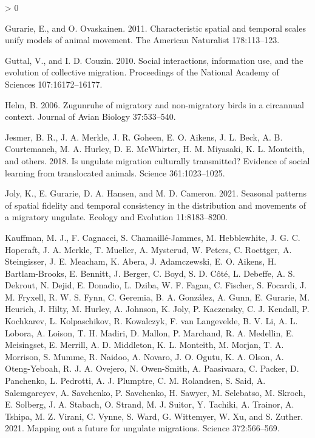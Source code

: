 \documentclass[12pt]{article}
\newlength{\cslhangindent}
\newenvironment{CSLReferences}[2] %
 {%
  \setlength{\parindent}{0pt}
  \ifodd #1 \everypar{\setlength{\hangindent}{\cslhangindent}}\ignorespaces\fi
  \ifnum #2 > 0
  \setlength{\parskip}{#2\baselineskip}
  \fi
 }%
 {}
\begin{document}
\begin{CSLReferences}{1}{0}
\leavevmode\hypertarget{ref-Gurarie2011}{}%
Gurarie, E., and O. Ovaskainen. 2011. Characteristic spatial and
temporal scales unify models of animal movement. The American Naturalist
178:113--123.

\leavevmode\hypertarget{ref-Guttal2010}{}%
Guttal, V., and I. D. Couzin. 2010. Social interactions, information
use, and the evolution of collective migration. Proceedings of the
National Academy of Sciences 107:16172--16177.

\leavevmode\hypertarget{ref-Helm2006}{}%
Helm, B. 2006. Zugunruhe of migratory and non-migratory birds in a
circannual context. Journal of Avian Biology 37:533--540.

\leavevmode\hypertarget{ref-Jesmer2018}{}%
Jesmer, B. R., J. A. Merkle, J. R. Goheen, E. O. Aikens, J. L. Beck, A.
B. Courtemanch, M. A. Hurley, D. E. McWhirter, H. M. Miyasaki, K. L.
Monteith, and others. 2018. {Is ungulate migration culturally
transmitted? Evidence of social learning from translocated animals}.
Science 361:1023--1025.

\leavevmode\hypertarget{ref-Joly2021}{}%
Joly, K., E. Gurarie, D. A. Hansen, and M. D. Cameron. 2021. Seasonal
patterns of spatial fidelity and temporal consistency in the
distribution and movements of a migratory ungulate. Ecology and
Evolution 11:8183--8200.

\leavevmode\hypertarget{ref-Kauffman2021}{}%
Kauffman, M. J., F. Cagnacci, S. Chamaillé-Jammes, M. Hebblewhite, J. G.
C. Hopcraft, J. A. Merkle, T. Mueller, A. Mysterud, W. Peters, C.
Roettger, A. Steingisser, J. E. Meacham, K. Abera, J. Adamczewski, E. O.
Aikens, H. Bartlam-Brooks, E. Bennitt, J. Berger, C. Boyd, S. D. Côté,
L. Debeffe, A. S. Dekrout, N. Dejid, E. Donadio, L. Dziba, W. F. Fagan,
C. Fischer, S. Focardi, J. M. Fryxell, R. W. S. Fynn, C. Geremia, B. A.
González, A. Gunn, E. Gurarie, M. Heurich, J. Hilty, M. Hurley, A.
Johnson, K. Joly, P. Kaczensky, C. J. Kendall, P. Kochkarev, L.
Kolpaschikov, R. Kowalczyk, F. van Langevelde, B. V. Li, A. L. Lobora,
A. Loison, T. H. Madiri, D. Mallon, P. Marchand, R. A. Medellin, E.
Meisingset, E. Merrill, A. D. Middleton, K. L. Monteith, M. Morjan, T.
A. Morrison, S. Mumme, R. Naidoo, A. Novaro, J. O. Ogutu, K. A. Olson,
A. Oteng-Yeboah, R. J. A. Ovejero, N. Owen-Smith, A. Paasivaara, C.
Packer, D. Panchenko, L. Pedrotti, A. J. Plumptre, C. M. Rolandsen, S.
Said, A. Salemgareyev, A. Savchenko, P. Savchenko, H. Sawyer, M.
Selebatso, M. Skroch, E. Solberg, J. A. Stabach, O. Strand, M. J.
Suitor, Y. Tachiki, A. Trainor, A. Tshipa, M. Z. Virani, C. Vynne, S.
Ward, G. Wittemyer, W. Xu, and S. Zuther. 2021. Mapping out a future for
ungulate migrations. Science 372:566--569.


\end{CSLReferences}
\end{document}
